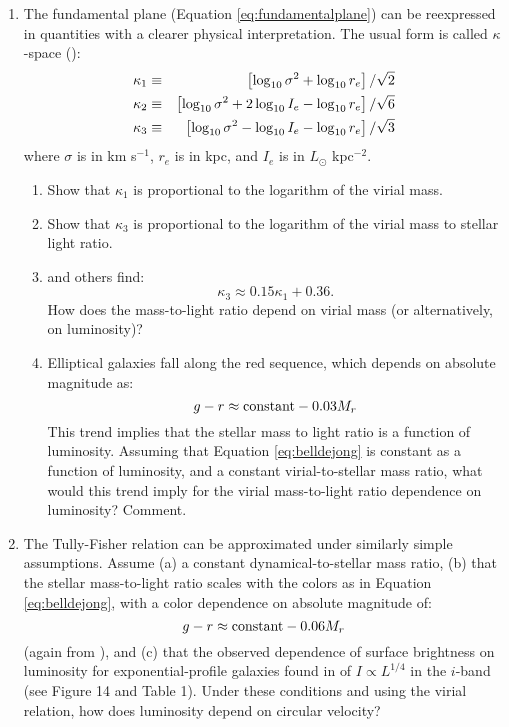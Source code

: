 \begin{enumerate}
\item The fundamental plane (Equation \ref{eq:fundamentalplane}) can
be reexpressed in quantities with a clearer physical
interpretation. The usual form is called $\kappa$-space
(\citealt{bender92a}): 
\begin{eqnarray}
\kappa_1 &\equiv& \left[ \log_{10} \sigma^2 + \log_{10} r_e \right]
/ \sqrt{2} \cr
\kappa_2 &\equiv& \left[ \log_{10} \sigma^2 + 2 \log_{10} I_e
- \log_{10} r_e \right] / \sqrt{6} \cr
\kappa_3 &\equiv& \left[ \log_{10} \sigma^2 - \log_{10} I_e
- \log_{10} r_e \right] / \sqrt{3}
\end{eqnarray}
where $\sigma$ is in km s$^{-1}$, $r_e$ is in kpc, and $I_e$ is in
$L_\odot$ kpc$^{-2}$. 
\begin{enumerate}
\item Show that $\kappa_1$ is proportional to the logarithm of the
virial mass.
\item Show that $\kappa_3$ is proportional to the logarithm of the
virial mass to stellar light ratio.
\item \cite{bender92a} and others find:
\begin{equation}
\kappa_3 \approx 0.15 \kappa_1 + 0.36.
\end{equation}
How does the mass-to-light ratio depend on virial mass (or
alternatively, on luminosity)?
\item Elliptical galaxies fall along the red sequence, which depends
on absolute magnitude as:
\begin{equation}
g-r \approx {\rm constant} - 0.03 M_r
\end{equation}
This trend implies that the stellar mass to light ratio is a function
of luminosity. Assuming that Equation \ref{eq:belldejong} is constant as a
function of luminosity, and a constant virial-to-stellar mass ratio,
what would this trend imply for the virial mass-to-light ratio
dependence on luminosity? Comment.
\end{enumerate}
\item The Tully-Fisher relation can be approximated under similarly
simple assumptions. Assume (a) a constant dynamical-to-stellar mass ratio,
(b) that the stellar mass-to-light ratio scales with the colors as in
Equation \ref{eq:belldejong}, with a color dependence on absolute
magnitude of: 
\begin{equation}
g-r \approx {\rm constant} - 0.06 M_r
\end{equation}
(again from \citealt{blanton03d}), and (c) that the observed
dependence of surface brightness on luminosity for exponential-profile
galaxies found in \citet{blanton03d} of $I\propto L^{1/4}$ in the
$i$-band (see Figure 14 and Table 1). Under these conditions and using
the virial relation, how does luminosity depend on circular velocity?


\end{enumerate}
